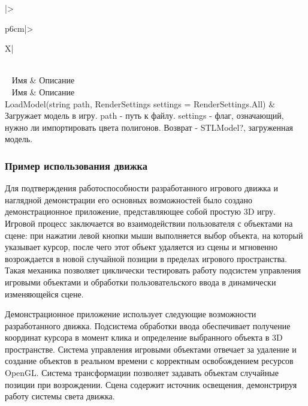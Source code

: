 \begin{xltabular}{\textwidth}{|>{\raggedright\arraybackslash}p{6cm}|>{\raggedright\arraybackslash}X|}
	\caption{Методы класса STLImporter\label{table20:table}}\\ \hline
	~ \centrow Имя & \centrow Описание \\ \hline
	\endfirsthead
	~ \centrow Имя & \centrow Описание \\ \hline 
	\finishhead
	LoadModel(string path, RenderSettings settings = RenderSettings.All) & Загружает модель в игру. path - путь к файлу. settings - флаг, означающий, нужно ли импортировать цвета полигонов. Возврат - STLModel?, загруженная модель.
\end{xltabular}

\subsubsection{Пример использования движка}

Для подтверждения работоспособности разработанного игрового движка и наглядной демонстрации его основных возможностей было создано демонстрационное приложение, представляющее собой простую 3D игру. Игровой процесс заключается во взаимодействии пользователя с объектами на сцене: при нажатии левой кнопки мыши выполняется выбор объекта, на который указывает курсор, после чего этот объект удаляется из сцены и мгновенно возрождается в новой случайной позиции в пределах игрового пространства. Такая механика позволяет циклически тестировать работу подсистем управления игровыми объектами и обработки пользовательского ввода в динамически изменяющейся сцене.

Демонстрационное приложение использует следующие возможности разработанного движка. Подсистема обработки ввода обеспечивает получение координат курсора в момент клика и определение выбранного объекта в 3D пространстве. Система управления игровыми объектами отвечает за удаление и создание объектов в реальном времени с корректным освобождением ресурсов OpenGL. Система трансформации позволяет задавать объектам случайные позиции при возрождении. Сцена содержит источник освещения, демонстрируя работу системы света движка.

